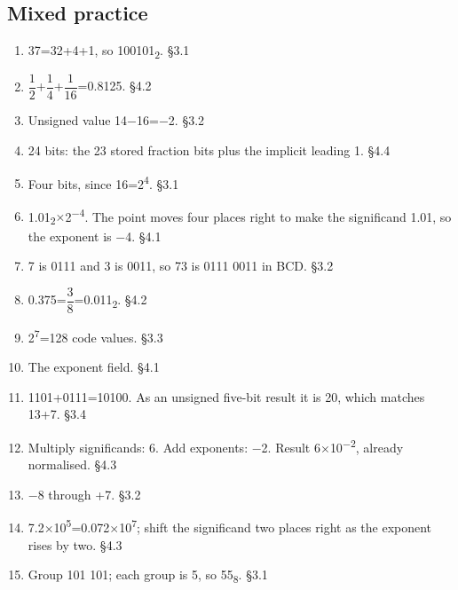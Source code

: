\documentclass[11pt]{article}
\begin{document}
\begin{keepsection}\subsection{Mixed practice}

\begin{enumerate}
\item 37=32+4+1, so 100101\textsubscript{2}. \hfill{\small\color{FAUblue}§3.1}
\item {\small\ensuremath{\dfrac{1}{2}}}+{\small\ensuremath{\dfrac{1}{4}}}+{\small\ensuremath{\dfrac{1}{16}}}=0.8125. \hfill{\small\color{FAUblue}§4.2}
\item Unsigned value 14\ensuremath{-}16=\ensuremath{-}2. \hfill{\small\color{FAUblue}§3.2}
\item 24 bits: the 23 stored fraction bits plus the implicit leading 1. \hfill{\small\color{FAUblue}§4.4}
\item Four bits, since 16=2\textsuperscript{4}. \hfill{\small\color{FAUblue}§3.1}
\item 1.01\textsubscript{2}\ensuremath{\times}2\textsuperscript{\ensuremath{-}4}. The point moves four places right to make the significand 1.01, so the exponent is \ensuremath{-}4. \hfill{\small\color{FAUblue}§4.1}
\item 7 is 0111 and 3 is 0011, so 73 is 0111 0011 in BCD. \hfill{\small\color{FAUblue}§3.2}
\item 0.375={\small\ensuremath{\dfrac{3}{8}}}=0.011\textsubscript{2}. \hfill{\small\color{FAUblue}§4.2}
\item 2\textsuperscript{7}=128 code values. \hfill{\small\color{FAUblue}§3.3}
\item The exponent field. \hfill{\small\color{FAUblue}§4.1}
\item 1101+0111=10100. As an unsigned five-bit result it is 20, which matches 13+7. \hfill{\small\color{FAUblue}§3.4}
\item Multiply significands: 6. Add exponents: \ensuremath{-}2. Result 6\ensuremath{\times}10\textsuperscript{\ensuremath{-}2}, already normalised. \hfill{\small\color{FAUblue}§4.3}
\item \ensuremath{-}8 through +7. \hfill{\small\color{FAUblue}§3.2}
\item 7.2\ensuremath{\times}10\textsuperscript{5}=0.072\ensuremath{\times}10\textsuperscript{7}; shift the significand two places right as the exponent rises by two. \hfill{\small\color{FAUblue}§4.3}
\item Group 101 101; each group is 5, so 55\textsubscript{8}. \hfill{\small\color{FAUblue}§3.1}

\end{enumerate}
\end{keepsection}
\end{document}
